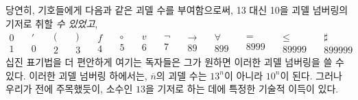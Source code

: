 \documentclass[12pt]{paper}
\begin{document}
  당연히, 기호들에게 다음과 같은 괴델 수를 부여함으로써, 13 대신 10을 괴델 넘버링의 기저로 취할 \textit{수 있었고},
  $$ \begin{matrix}
    0 \\
    1
  \end{matrix} \quad
  \begin{matrix}
    ' \\
    0
  \end{matrix} \quad
  \begin{matrix}
    ( \\
    2
  \end{matrix} \quad
  \begin{matrix}
    ) \\
    3
  \end{matrix} \quad
  \begin{matrix}
    f \\
    4
  \end{matrix} \quad
  \begin{matrix}
    \circ \\
    5
  \end{matrix} \quad
  \begin{matrix}
    v \\
    6  
  \end{matrix} \quad
  \begin{matrix}
    \lnot \\
    7
  \end{matrix} \quad
  \begin{matrix}
    \rightarrow \\
    89
  \end{matrix} \quad
  \begin{matrix}
    \forall \\
    899
  \end{matrix} \quad
  \begin{matrix}
    = \\
    8999
  \end{matrix} \quad
  \begin{matrix}
    \leq \\
    89999
  \end{matrix} \quad
  \begin{matrix}
    \sharp \\
    899999
  \end{matrix} $$
  십진 표기법을 더 편안하게 여기는 독자들은 그가 원하면 이러한 괴델 넘버링을 쓸 수 있다.
  이러한 괴델 넘버링 하에서는, $\overline{n}$의 괴델 수는 $13^{n}$이 아니라 $10^{n}$이 된다.
  그러나 우리가 전에 주목했듯이, 소수인 $13$을 기저로 하는 데에 특정한 기술적 이득이 있다.
\end{document}
